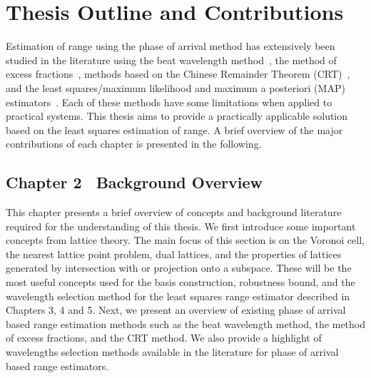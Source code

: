 \section{Thesis Outline and Contributions}
Estimation of range using the phase of arrival method has extensively been studied in the literature using the beat wavelength method~\cite{Towers_frequency_selection_interferometry_2003,Towers:04_generalised_frequency_selection}, the method of excess fractions~\cite{Falaggis_excess_fractions_2011,Falaggis_excess_fractions_2012,Falaggis_excess_fractions_2013,Falaggis_algebraic_solution_2014}, methods based on the Chinese Remainder Theorem (CRT)~\cite{Oystein_Ore_general_chinese_Remainder_1952, Oded_Chinese_remaindering_with_errors_2000, Xia_generalised_CRT_2005, Xia2007, XWLi2008, W.Wang_closed_form_crt_2010, YangBin_range_estimation_with_CRT_2014, Xiao_multistage_crt_2014}, and the least squares/maximum likelihood and maximum a posteriori (MAP) estimators~\cite{Teunissen_GPS_1995, Hassibi_GPS_1998, Li_distance_est_wrapped_phase}. Each of these methods have some limitations when applied to practical systems. This thesis aims to provide a practically applicable solution based on the least squares estimation of range. A brief overview of the major contributions of each chapter is presented in the following.

\subsection*{Chapter 2 \textemdash~Background Overview}
This chapter presents a brief overview of concepts and background literature required for the understanding of this thesis. We first introduce some important concepts from lattice theory. The main focus of this section is on the Voronoi cell, the nearest lattice point problem, dual lattices, and the properties of lattices generated by intersection with or projection onto a subspace. These will be the most useful concepts used for the basis construction, robustness bound, and the wavelength selection method for the least squares range estimator described in Chapters 3, 4 and 5. %
Next, we present an overview of existing phase of arrival based range estimation methods such as the beat wavelength method, the method of excess fractions, and the CRT method. We also provide a highlight of wavelengths selection methods available in the literature for phase of arrival based range estimators. 

